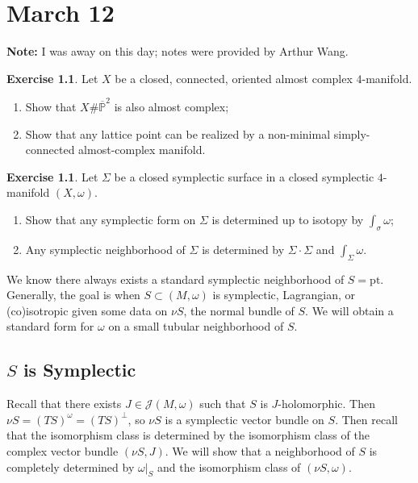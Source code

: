 \documentclass[leqno, openany]{memoir}
\theoremstyle{definition}
\newtheorem{exer}[thm]{Exercise}
\theoremstyle{remark}
\theoremstyle{plain}
\theoremstyle{definition}
\theoremstyle{remark}
\renewcommand{\P}{\mathbb{P}}
\newcommand{\mc}[1]{\mathcal{#1}}
\newcommand{\mr}[1]{\mathrm{#1}}
\begin{document}
    \chapter{March 12}%
    \label{cha:march_12}
    
    \textbf{Note:} I was away on this day; notes were provided by Arthur Wang.

    \begin{exer}
        Let $X$ be a closed, connected, oriented almost complex $4$-manifold.
        \begin{enumerate}
            \item Show that $X \# \overline{\P}^2$ is also almost complex;
            \item Show that any lattice point can be realized by a non-minimal simply-connected almost-complex manifold.
        \end{enumerate}
    \end{exer}

    \begin{exer}
        Let $\Sigma$ be a closed symplectic surface in a closed symplectic $4$-manifold $(X, \omega)$.
        \begin{enumerate}
            \item Show that any symplectic form on $\Sigma$ is determined up to isotopy by $\int_{\sigma} \omega$;
            \item Any symplectic neighborhood of $\Sigma$ is determined by $\Sigma \cdot \Sigma$ and $\int_{\Sigma} \omega$.
        \end{enumerate}
    \end{exer}

    We know there always exists a standard symplectic neighborhood of $S = \mr{pt}$. Generally, the goal is when $S \subset (M, \omega)$ is symplectic, Lagrangian, or (co)isotropic given some data on $\nu S$, the normal bundle of $S$. We will obtain a standard form for $\omega$ on a small tubular neighborhood of $S$.

    \section{$S$ is Symplectic}%
    \label{sub:_s_is_symplectic}
    
    Recall that there exists $J \in \mc{J}(M, \omega)$ such that $S$ is $J$-holomorphic. Then $\nu S = (TS)^{\omega} = (TS)^{\perp}$, so $\nu S$ is a symplectic vector bundle on $S$. Then recall that the isomorphism class is determined by the isomorphism class of the complex vector bundle $(\nu S, J)$. We will show that a neighborhood of $S$ is completely determined by $\omega |_S$ and the isomorphism class of $(\nu S, \omega)$.
    
\end{document}

